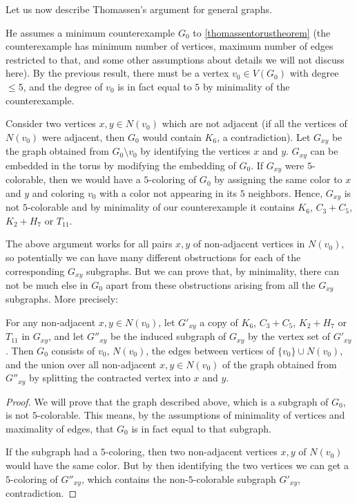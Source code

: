 Let us now describe Thomassen's argument for 
general graphs.

He assumes a minimum counterexample $G_0$ to \ref{thomassentorustheorem} (the counterexample has
minimum number of vertices, maximum number of edges restricted to that, and some other assumptions 
about details we will not discuss here). By the previous result, 
there must be a vertex $v_0 \in V(G_0)$ with degree $\leq 5$, and the degree of $v_0$ is in 
fact equal to $5$ by minimality of the counterexample. 

Consider two vertices $x, y \in N(v_0)$ which are not adjacent (if all the vertices of 
$N(v_0)$ were adjacent, then $G_0$ would contain $K_6$, a contradiction). Let $G_{xy}$ be 
the graph obtained from $G_0 \setminus v_0$ by identifying the vertices $x$ and $y$. 
$G_{xy}$ can be embedded in the torus by modifying the embedding of $G_0$. If $G_{xy}$ 
were $5$-colorable, then we would have a $5$-coloring of $G_0$ by assigning the same color 
to $x$ and $y$ and coloring $v_0$ with a color not appearing in its $5$ neighbors. 
Hence, $G_{xy}$ is not $5$-colorable and by minimality of our counterexample it 
contains $K_6$, $C_3 + C_5$, $K_2 + H_7$ or $T_{11}$.

The above argument works for all pairs $x, y$ of non-adjacent vertices in $N(v_0)$, so potentially 
we can have many different obstructions for each of the corresponding $G_{xy}$ subgraphs. 
But we can prove that, by minimality, there can not be much else in $G_0$ apart from these
obstructions arising from all the $G_{xy}$ subgraphs. More precisely:  

\begin{proposition}
	\label{g0proposition}
	For any non-adjacent $x, y \in N(v_0)$, let $G'_{xy}$ a copy of 
	$K_6$, $C_3 + C_5$, $K_2 + H_7$ or $T_{11}$ in $G_{xy}$, and let $G''_{xy}$ be the induced
	subgraph of $G_{xy}$ by the vertex set of $G'_{xy}$. Then $G_0$ consists of $v_0$, $N(v_0)$, 
	the edges between vertices of $\{v_0\} \cup N(v_0)$, and the union over all non-adjacent 
	$x, y \in N(v_0)$ of the graph obtained from $G''_{xy}$ by splitting the contracted vertex
	into $x$ and $y$.  
\end{proposition}

\begin{proof}
We will prove that the graph described above, which is a subgraph of $G_0$, is not $5$-colorable. 
This means, by the assumptions of minimality of vertices and maximality of edges, that $G_0$ is
in fact equal to that subgraph. 

If the subgraph had a $5$-coloring, then two non-adjacent vertices $x, y$ of $N(v_0)$ would 
have the same color. But by then identifying the two vertices we can get a $5$-coloring 
of $G''_{xy}$, which contains the non-$5$-colorable subgraph $G'_{xy}$, contradiction.

\end{proof}

